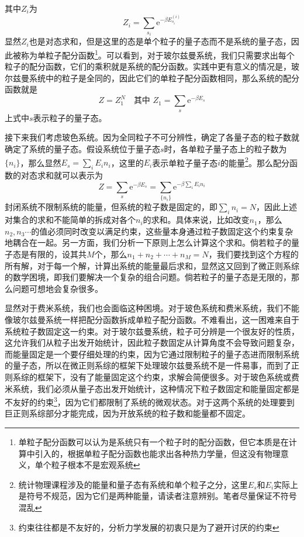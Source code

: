 \documentclass[../../main.tex]{subfiles}
\begin{document}
其中\(Z_{i}\)为
\begin{equation*}
    Z_{i}=\sum_{s_i}\mathrm{e}^{-\beta E_{s_i}^{{(i)}}} 
\end{equation*}
显然\(Z_i\)也是对态求和，但是这里的态是单个粒子的量子态而不是系统的量子态，因此被称为单粒子配分函数\footnote{单粒子配分函数可以认为是系统只有一个粒子时的配分函数，但它本质是在计算中引入的，根据单粒子配分函数也能求出各种热力学量，但这没有物理意义，单个粒子根本不是宏观系统}。可以看到，对于玻尔兹曼系统，我们只需要求出每个粒子的配分函数，它们的乘积就是系统的配分函数。实践中更有意义的情况是，玻尔兹曼系统中的粒子是全同的，因此它们的单粒子配分函数相同，那么系统的配分函数就是
\begin{equation}
    Z=Z_1^N\quad \text{其中}\,\,Z_1=\sum_{s}\mathrm{e}^{-\beta E_{s}} 
\end{equation}
上式中\(s\)表示粒子的量子态。

接下来我们考虑玻色系统。因为全同粒子不可分辨性，确定了各量子态的粒子数就确定了系统的量子态。假设系统位于量子态\(s\)时，各单粒子量子态上的粒子数为\(\{n_i\}\)，那么显然\(E_s=\sum_i E_in_i\)，这里的\(E_i\)表示单粒子量子态\(i\)的能量\footnote{统计物理课程涉及的能量和量子态有系统和单个粒子之分，这里\(E_s\)和\(E_i\)实际上是符号不规范，因为它们是两种能量，请读者注意辨别。笔者尽量保证不符号混乱}。那么配分函数的对态求和就可以表示为
\begin{equation}
    Z=\sum_s\mathrm{e}^{-\beta E_s}=\sum_{\{n_i\}}\mathrm{e}^{-\beta \sum_i E_i n_i}
\end{equation}
封闭系统不限制系统的能量，但系统的粒子数是固定的，即\(\sum_i n_i=N\)，因此上述对集合的求和不能简单的拆成对各个\(n_i\)的求和。具体来说，比如改变\(n_1\)，那么\(n_2,n_3\cdots\)的值必须同时改变以满足约束，这些量本身通过粒子数固定这个约束复杂地耦合在一起。另一方面，我们分析一下原则上怎么计算这个求和。倘若粒子的量子态是有限的，设其共\(M\)个，那么\(n_1+n_2+\cdots+n_M=N\)，我们要找到这个方程的所有解，对于每一个解，计算出系统的能量最后求和，显然这又回到了微正则系综的数学困境，即我们要解决一个复杂的组合问题。倘若粒子的量子态是无限的，那么问题可想地会复杂很多。

显然对于费米系统，我们也会面临这种困境。对于玻色系统和费米系统，我们不能像玻尔兹曼系统一样把配分函数拆成单粒子配分函数。不难看出，这一困难来自于系统粒子数固定这一约束。对于玻尔兹曼系统，粒子可分辨是一个很友好的性质，这允许我们从粒子出发开始统计，因此粒子数固定从计算角度不会导致问题复杂，而能量固定是一个要仔细处理的约束，因为它通过限制粒子的量子态进而限制系统的量子态，所以在微正则系综的框架下处理玻尔兹曼系统不是一件易事，而到了正则系综的框架下，没有了能量固定这个约束，求解会简便很多。对于玻色系统或费米系统，我们必须从量子态出发开始统计，这种情况下粒子数固定和能量固定都是不友好的约束\footnote{约束往往都是不友好的，分析力学发展的初衷只是为了避开讨厌的约束}，因为它们都限制了系统的微观状态。对于这两个系统的处理要到巨正则系综部分才能完成，因为开放系统的粒子数和能量都不固定。
\end{document}

